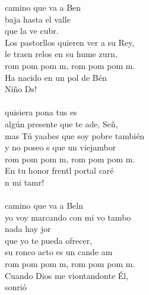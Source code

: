 \begin{cancion}[El tamborilero][]%
	 camino que va a Ben \\
baja hasta el valle \\
	que la ve cubr. \\
	Los pastorllos quieren ver a su Rey,\\
	le traen relos en su hume zurn,\\
	rom pom pom m, rom pom pom m.\\
	Ha nacido en un pol de Bén\\
	 Niño Ds!\\
\jump\\
	 quisiera pona tus es\\
	algún presente que te ade, Señ, \\
	mas Tú yaabes que soy pobre también\\
	y no poseo s que un viejambor\\
	rom pom pom m, rom pom pom m.\\
	En tu honor frentl portal caré\\
	n mi tamr!\\
\jump\\
	 camino que va a Beln\\
	yo voy marcando con mi vo tambo\\
	nada hay jor \\
que yo te pueda ofrecer,\\
	su ronco acto es un cande am\\
	rom pom pom m, rom pom pom m.\\
	Cuando Dios me viontandonte Él,\\
	 sonrió\\
\end{cancion}%
